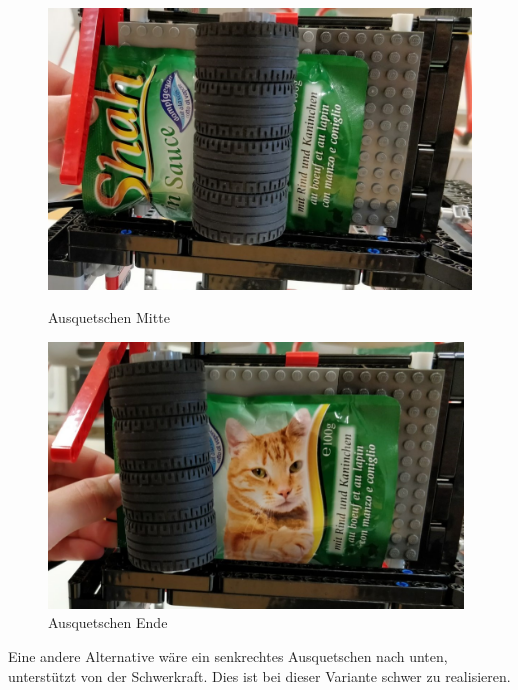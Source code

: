 \begin{figure}[H]
   \begin{minipage}[hbt]{0.5\textwidth} %
      \includegraphics[width=1\textwidth]{Bilder/Ablauf_1_png/Ausquetschen_2}
      \caption{Ausquetschen Mitte}
      \label{Ausquetschen Mitte}
   \end{minipage}
   \hspace{.04\linewidth}%
   \begin{minipage}[hbt]{0.5\textwidth} %
      \includegraphics[width=0.98\textwidth]{Bilder/Ablauf_1_png/Ausquetschen_3}
      \caption{Ausquetschen Ende}
	  \label{Ausquetschen Ende}      
      \end{minipage}
\end{figure}

Eine andere Alternative wäre ein senkrechtes Ausquetschen nach unten, unterstützt von der Schwerkraft. Dies ist bei dieser Variante schwer zu realisieren.

